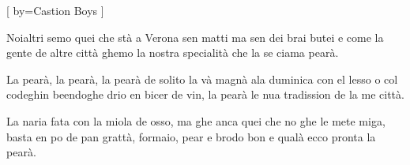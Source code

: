 [
by={Castion Boys}%
]


  
	\beginverse\memorize %
		Noialtri semo quei che st\`a a Verona
		sen matti ma sen dei brai butei
		e come la gente de altre citt\`a
		ghemo la nostra specialit\`a
		che la se ciama pear\`a.
	\endverse

	\beginchorus
		La pear\`a, la pear\`a, la pear\`a
		de solito la v\`a magn\`a ala duminica
		con el lesso o col codeghin
		beendoghe drio en bicer de vin,
		la pear\`a le nua tradission de la me citt\`a.
	\endchorus
	
	\beginverse
		La naria fata con la miola de osso,
		ma ghe anca quei che no ghe le mete miga,
		basta en po de pan gratt\`a,
		formaio, pear e brodo bon
		e qual\`a ecco pronta la pear\`a.
	\endverse
	
	\beginchorus
	
	\endchorus
	



\endsong
